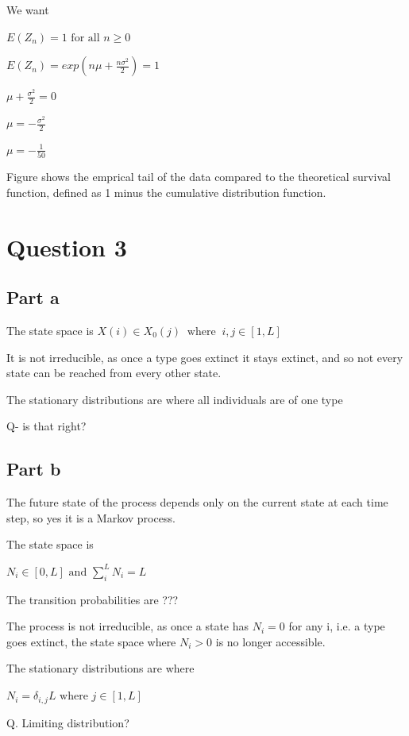 \documentclass{article}
\begin{document}
We want 

$E(Z_n) = 1 \text{ for all } n\geq0$

$E(Z_n) = exp(n\mu + \frac{n\sigma^2}{2}) = 1$

$\mu + \frac{\sigma^2}{2} = 0$

$\mu = - \frac{\sigma^2}{2}$

$\mu = -\frac{1}{50}$

Figure shows the emprical tail of the data compared to the theoretical survival function, defined as 1 minus the cumulative distribution function.




\section{Question 3}

\subsection{Part a}

The state space is $X(i) \in X_0(j) \ \text{ where } \ i,j \in [1,L]$ 

It is not irreducible, as once a type goes extinct it stays extinct, and so not every state can be reached from every other state.

The stationary distributions are where all individuals are of one type

Q- is that right?

\subsection{Part b}

The future state of the process depends only on the current state at each time step, so yes it is a Markov process. 

The state space is 

$N_i \in [0,L] \text{ and } \sum\limits_i^LN_i = L$ 

The transition probabilities are ???

The process is not irreducible, as once a state has $N_i = 0$ for any i, i.e. a type goes extinct, the state space where $N_i >0$ is no longer accessible.

The stationary distributions are where 

$N_i = \delta_{i,j}L \text{ where } j \in [1,L]$

Q. Limiting distribution?
\end{document}

